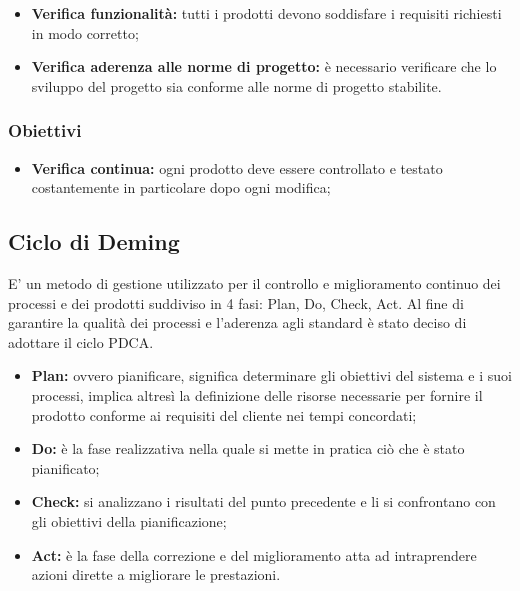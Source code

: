 \begin{itemize}
    \item  \textbf{Verifica funzionalità:} tutti i prodotti devono soddisfare i requisiti richiesti in modo corretto;
    \item \textbf{Verifica aderenza alle norme di progetto:} è necessario verificare che lo sviluppo del progetto sia conforme alle norme di progetto stabilite.
    
\end{itemize}


\subsubsection{Obiettivi}
\begin{itemize}
    \item \textbf{Verifica continua:} ogni prodotto deve essere controllato e testato costantemente in particolare dopo ogni modifica;

\end{itemize}

\subsection{Ciclo di Deming}
E' un metodo di gestione utilizzato per il controllo e miglioramento continuo dei processi e dei prodotti suddiviso in 4 fasi: Plan, Do, Check, Act.
Al fine di garantire la qualità dei processi e l'aderenza agli standard è stato deciso di adottare il ciclo PDCA.
\begin{itemize}
    \item \textbf{Plan:} ovvero pianificare, significa determinare gli obiettivi del sistema e i suoi processi, implica altresì la definizione delle risorse necessarie per fornire il prodotto conforme ai requisiti del cliente nei tempi concordati;
    \item \textbf{Do:} è la fase realizzativa nella quale si mette in pratica ciò che è stato pianificato;
    \item \textbf{Check:} si analizzano i risultati del punto precedente e li si confrontano con gli obiettivi della pianificazione;
    \item \textbf{Act:} è la fase della correzione e del miglioramento atta ad intraprendere azioni dirette a migliorare le prestazioni.
\end{itemize}














